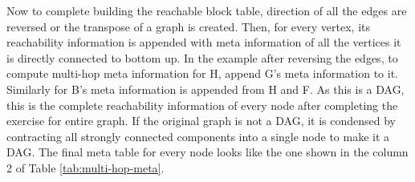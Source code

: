 


Now to complete building the reachable block table, direction of all the edges are reversed or the transpose of a graph is created. Then, for every vertex, its reachability information is appended with meta information of all the vertices it is directly connected to bottom up. In the example after reversing the edges, to compute multi-hop meta information for H, append G's meta information to it. Similarly for B's meta information is appended from H and F. As this is a DAG, this is the complete reachability information of every node after completing the exercise for entire graph. If the original graph is not a DAG, it is condensed by contracting all strongly connected components into a single node to make it a DAG. The final meta table for every node looks like the one shown in the column 2 of Table \ref{tab:multi-hop-meta}.

